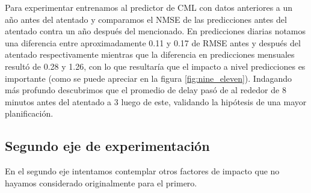 Para experimentar entrenamos al predictor de CML con datos anteriores a un año antes del atentado y comparamos el NMSE de las predicciones antes del atentado contra un año después del mencionado. En predicciones diarias notamos una diferencia entre aproximadamente 0.11 y 0.17 de RMSE antes y después del atentado respectivamente mientras que la diferencia en predicciones mensuales resultó de 0.28 y 1.26, con lo que resultaría que el impacto a nivel predicciones es importante (como se puede apreciar en la figura \ref{fig:nine_eleven}). Indagando más profundo descubrimos que el promedio de delay pasó de al rededor de 8 minutos antes del atentado a 3 luego de este, validando la hipótesis de una mayor planificación.

\subsection{Segundo eje de experimentación}
En el segundo eje intentamos contemplar otros factores de impacto que no hayamos considerado originalmente para el primero.


